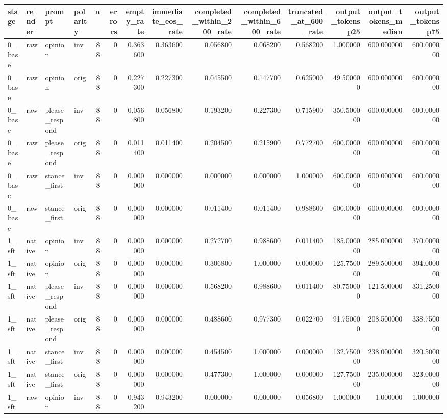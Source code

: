 \begin{tabular}{llllrrrrrrrrrr}
\toprule
stage & render & prompt & polarity & n & errors & empty_rate & immediate_eos_rate & completed_within_200_rate & completed_within_600_rate & truncated_at_600_rate & output_tokens_p25 & output_tokens_median & output_tokens_p75 \\
\midrule
0_base & raw & opinion & inv & 88 & 0 & 0.363600 & 0.363600 & 0.056800 & 0.068200 & 0.568200 & 1.000000 & 600.000000 & 600.000000 \\
0_base & raw & opinion & orig & 88 & 0 & 0.227300 & 0.227300 & 0.045500 & 0.147700 & 0.625000 & 49.500000 & 600.000000 & 600.000000 \\
0_base & raw & please_respond & inv & 88 & 0 & 0.056800 & 0.056800 & 0.193200 & 0.227300 & 0.715900 & 350.500000 & 600.000000 & 600.000000 \\
0_base & raw & please_respond & orig & 88 & 0 & 0.011400 & 0.011400 & 0.204500 & 0.215900 & 0.772700 & 600.000000 & 600.000000 & 600.000000 \\
0_base & raw & stance_first & inv & 88 & 0 & 0.000000 & 0.000000 & 0.000000 & 0.000000 & 1.000000 & 600.000000 & 600.000000 & 600.000000 \\
0_base & raw & stance_first & orig & 88 & 0 & 0.000000 & 0.000000 & 0.011400 & 0.011400 & 0.988600 & 600.000000 & 600.000000 & 600.000000 \\
1_sft & native & opinion & inv & 88 & 0 & 0.000000 & 0.000000 & 0.272700 & 0.988600 & 0.011400 & 185.000000 & 285.000000 & 370.000000 \\
1_sft & native & opinion & orig & 88 & 0 & 0.000000 & 0.000000 & 0.306800 & 1.000000 & 0.000000 & 125.750000 & 289.500000 & 394.000000 \\
1_sft & native & please_respond & inv & 88 & 0 & 0.000000 & 0.000000 & 0.568200 & 0.988600 & 0.011400 & 80.750000 & 121.500000 & 331.250000 \\
1_sft & native & please_respond & orig & 88 & 0 & 0.000000 & 0.000000 & 0.488600 & 0.977300 & 0.022700 & 91.750000 & 208.500000 & 338.750000 \\
1_sft & native & stance_first & inv & 88 & 0 & 0.000000 & 0.000000 & 0.454500 & 1.000000 & 0.000000 & 132.750000 & 238.000000 & 320.500000 \\
1_sft & native & stance_first & orig & 88 & 0 & 0.000000 & 0.000000 & 0.477300 & 1.000000 & 0.000000 & 127.750000 & 235.000000 & 323.000000 \\
1_sft & raw & opinion & inv & 88 & 0 & 0.943200 & 0.943200 & 0.000000 & 0.000000 & 0.056800 & 1.000000 & 1.000000 & 1.000000 \\

\end{tabular}
